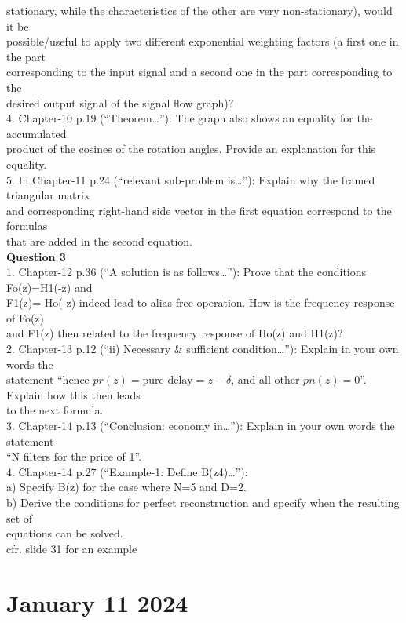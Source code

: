 \documentclass[
  a4paper,
  ,captions=tableheading
]{scrartcl}
\begin{document}
stationary, while the characteristics of the other are very
non-stationary), would it be\\
possible/useful to apply two different exponential weighting factors (a
first one in the part\\
corresponding to the input signal and a second one in the part
corresponding to the\\
desired output signal of the signal flow graph)?\\
4. Chapter-10 p.19 (``Theorem\ldots''): The graph also shows an equality
for the accumulated\\
product of the cosines of the rotation angles. Provide an explanation
for this equality.\\
5. In Chapter-11 p.24 (``relevant sub-problem is\ldots''): Explain why
the framed triangular matrix\\
and corresponding right-hand side vector in the first equation
correspond to the formulas\\
that are added in the second equation.\\
\textbf{Question 3}\\
1. Chapter-12 p.36 (``A solution is as follows\ldots''): Prove that the
conditions Fo(z)=H1(-z) and\\
F1(z)=-Ho(-z) indeed lead to alias-free operation. How is the frequency
response of Fo(z)\\
and F1(z) then related to the frequency response of Ho(z) and H1(z)?\\
2. Chapter-13 p.12 (``ii) Necessary \& sufficient condition\ldots''):
Explain in your own words the\\
statement ``hence \(pr(z)=\text{pure delay}=z-\delta\), and all other
\(pn(z)=0\)''. Explain how this then leads\\
to the next formula.\\
3. Chapter-14 p.13 (``Conclusion: economy in\ldots''): Explain in your
own words the statement\\
``N filters for the price of 1''.\\
4. Chapter-14 p.27 (``Example-1: Define B(z4)\ldots''):\\
a) Specify B(z) for the case where N=5 and D=2.\\
b) Derive the conditions for perfect reconstruction and specify when the
resulting set of\\
equations can be solved.\\
cfr. slide 31 for an example

\section{\texorpdfstring{\textbf{January 11
2024}}{January 11 2024}}\label{january-11-2024}
\end{document}
